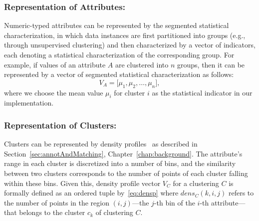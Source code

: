 \subsubsection{Representation of Attributes:}
Numeric-typed attributes can be represented by the segmented statistical characterization, in which data instances are first partitioned into groups (e.g., through unsupervised clustering) and then characterized by a vector of indicators, each denoting a statistical characterization of the corresponding group. For example, if values of an attribute $A$ are clustered into $n$ groups, then it can be represented by a vector of segmented statistical characterization as follows:
\[
V_A=\bigg[\mu_1, \mu_2, \ldots, \mu_n\bigg],
\]
where we choose the mean value $\mu_i$ for cluster $i$ as the statistical indicator in our implementation.

\subsubsection{Representation of Clusters:}
Clusters can be represented by density profiles~\cite{Bae2010} as described in Section~\ref{sec:annotAndMatching}, Chapter~\ref{chap:background}. The attribute's range in each cluster is discretized into a number of bins, and the similarity between two clusters corresponds to the number of points of each cluster falling within these bins. Given this, density profile vector $V_C$ for a clustering $C$ is formally defined as an ordered tuple by~\ref{eq:densp}
where $dens_C(k, i, j)$ refers to the number of points in the region $(i, j)$---the $j$-th bin of the $i$-th attribute---that belongs to the cluster $c_k$ of clustering $C$.


